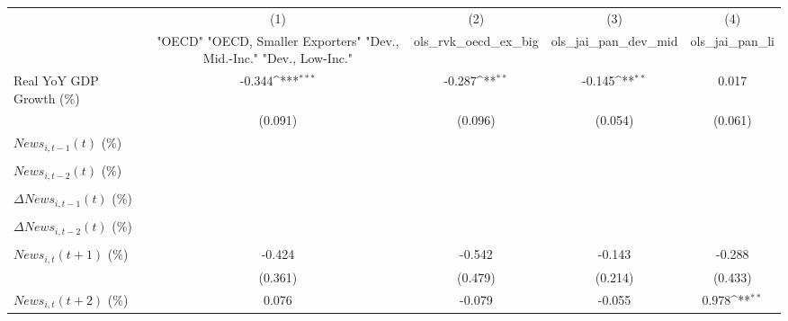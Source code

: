 {
\def\sym#1{\ifmmode^{#1}\else\(^{#1}\)\fi}
\begin{tabular}{l*{4}{c}}
\toprule
                    &\multicolumn{1}{c}{(1)}&\multicolumn{1}{c}{(2)}&\multicolumn{1}{c}{(3)}&\multicolumn{1}{c}{(4)}\\
                    &\multicolumn{1}{c}{ "OECD" "OECD, Smaller Exporters" "Dev., Mid.-Inc." "Dev., Low-Inc."}&\multicolumn{1}{c}{ols_rvk_oecd_ex_big}&\multicolumn{1}{c}{ols_jai_pan_dev_mid}&\multicolumn{1}{c}{ols_jai_pan_li}\\
\midrule
Real YoY GDP Growth (\%)&      -0.344\sym{***}&      -0.287\sym{**} &      -0.145\sym{**} &       0.017         \\
                    &     (0.091)         &     (0.096)         &     (0.054)         &     (0.061)         \\
\addlinespace
$ News_{i,t-1}(t)$ (\%)&                     &                     &                     &                     \\
                    &                     &                     &                     &                     \\
\addlinespace
$ News_{i,t-2}(t)$ (\%)&                     &                     &                     &                     \\
                    &                     &                     &                     &                     \\
\addlinespace
$ \Delta News_{i,t-1}(t)$ (\%)&                     &                     &                     &                     \\
                    &                     &                     &                     &                     \\
\addlinespace
$ \Delta News_{i,t-2}(t)$ (\%)&                     &                     &                     &                     \\
                    &                     &                     &                     &                     \\
\addlinespace
$ News_{i,t}(t+1)$ (\%)&      -0.424         &      -0.542         &      -0.143         &      -0.288         \\
                    &     (0.361)         &     (0.479)         &     (0.214)         &     (0.433)         \\
\addlinespace
$ News_{i,t}(t+2)$ (\%)&       0.076         &      -0.079         &      -0.055         &       0.978\sym{**} \\

\end{tabular}}
